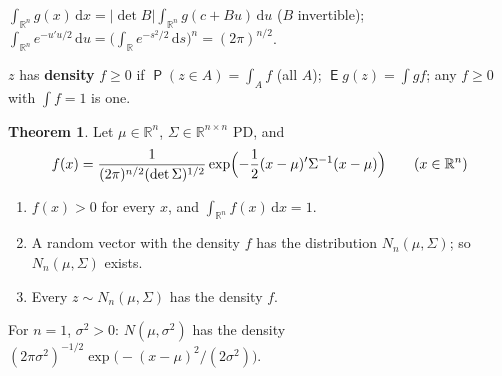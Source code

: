 \documentclass[12pt]{article}
\newcommand{\R}{\mathbb R}
\DeclareMathOperator\prb{\mathsf{P}}
\DeclareMathOperator\expc{\mathsf{E}}
\theoremstyle{definition}
\newtheorem{theorem}{Theorem}
\begin{document}
\begin{facts}[start=10]
\item\label{f-integrals} \(\int_{\R^n}g(x)\,\mathrm{d}x=\lvert\det B\rvert\int_{\R^n}g(c+Bu)\,\mathrm{d}u\) (\(B\)
invertible); \(\int_{\R^n}e^{-u'u/2}\,\mathrm{d}u=\bigl(\int_\R e^{-s^2/2}\,\mathrm{d}s\bigr)^n=(2\pi)^{n/2}\).
\item\label{f-density} \(z\) has \textbf{density} \(f\geqslant0\) if \(\prb(z\in A)=\int_Af\) (all \(A\));
\(\expc g(z)=\int gf\); any \(f\geqslant0\) with \(\int f=1\) is one.
\end{facts}
\begin{theorem}\label{b10.8}
Let \(\mu\in\R^n\), \(\Sigma\in\R^{n\times n}\) PD, and
\[
f(x)=\frac1{(2\pi)^{n/2}(\det\Sigma)^{1/2}}\exp\Bigl(-\frac12(x-\mu)'\Sigma^{-1}(x-\mu)\Bigr)\qquad(x\in\R^n)
\]
\begin{enumerate}
\item \(f(x)>0\) for every \(x\), and \(\int_{\R^n}f(x)\,\mathrm{d}x=1\).
\item A random vector with the density \(f\) has the distribution \(N_n(\mu,\Sigma)\); so \(N_n(\mu,\Sigma)\) exists.
\item Every \(z\sim N_n(\mu,\Sigma)\) has the density \(f\).
\end{enumerate}
For \(n=1\), \(\sigma^2>0\): \(N(\mu,\sigma^2)\) has the density \((2\pi\sigma^2)^{-1/2}\exp\bigl(-(x-\mu)^2/(2\sigma^2)\bigr)\).
\end{theorem}
\end{document}
